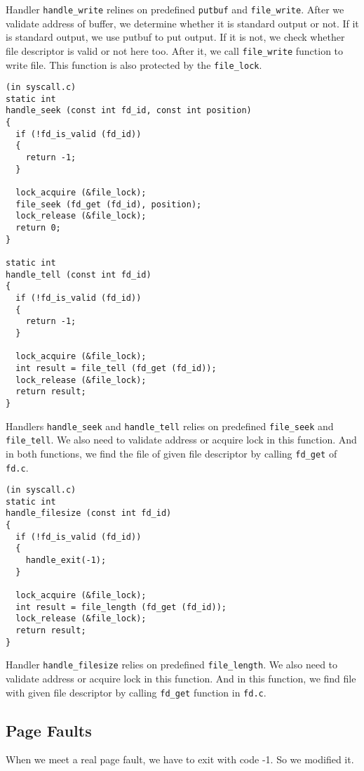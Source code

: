 \documentclass[a4paper,article,11pt,oneside]{article}
\begin{document}
Handler \texttt{handle\_write} relines on predefined \texttt{putbuf}
and  \texttt{file\_write}. After we validate address of buffer, we
determine whether it is standard output or not. If it is standard
output, we use putbuf to put output. If it is not, we check whether
file descriptor is valid or not here too. After it, we call
\texttt{file\_write} function to write file. This function is also
protected by the \texttt{file\_lock}.

\begin{verbatim}
(in syscall.c)
static int
handle_seek (const int fd_id, const int position) 
{
  if (!fd_is_valid (fd_id))
  {
    return -1;
  }

  lock_acquire (&file_lock);
  file_seek (fd_get (fd_id), position);
  lock_release (&file_lock);
  return 0;
}

static int
handle_tell (const int fd_id) 
{
  if (!fd_is_valid (fd_id))
  {
    return -1;
  }

  lock_acquire (&file_lock);
  int result = file_tell (fd_get (fd_id));
  lock_release (&file_lock);
  return result;
}
\end{verbatim}

Handlers \texttt{handle\_seek} and  \texttt{handle\_tell} relies on
predefined \texttt{file\_seek} and  \texttt{file\_tell}. We also need
to validate address or acquire lock in this function. And in both
functions, we find the file of given file descriptor by calling \texttt{fd\_get} of \texttt{fd.c}.

\begin{verbatim}
(in syscall.c)
static int
handle_filesize (const int fd_id) 
{
  if (!fd_is_valid (fd_id))
  {
    handle_exit(-1);
  }
   
  lock_acquire (&file_lock);
  int result = file_length (fd_get (fd_id));
  lock_release (&file_lock);
  return result;
}
\end{verbatim}

Handler \texttt{handle\_filesize} relies on predefined
\texttt{file\_length}. We also need to validate address or acquire lock in this function. And in this function, we find file with given file descriptor by calling  \texttt{fd\_get} function in \texttt{fd.c}.

\subsection{Page Faults}\label{secpagefault}
When we meet a real page fault, we have to exit with code -1. So we modified
it.
\end{document}
